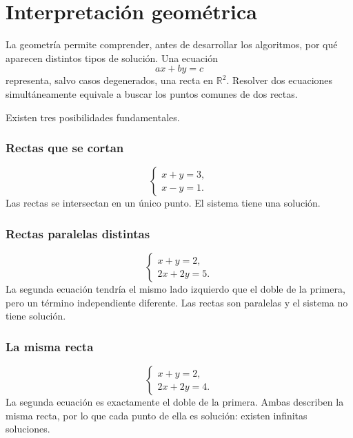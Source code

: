 \documentclass[12pt]{article}
\theoremstyle{remark}
\newcommand{\R}{\mathbb{R}}
\begin{document}
\section*{Interpretación geométrica}
La geometría permite comprender, antes de desarrollar los algoritmos, por qué aparecen distintos tipos de solución.
Una ecuación
\[
ax+by=c
\]
representa, salvo casos degenerados, una recta en $\R^2$. Resolver dos ecuaciones simultáneamente equivale a buscar los puntos comunes de dos rectas.

Existen tres posibilidades fundamentales.
\subsubsection*{Rectas que se cortan}
\[
\begin{cases}
x+y=3,\\
x-y=1.
\end{cases}
\]
Las rectas se intersectan en un único punto. El sistema tiene una solución.
\subsubsection*{Rectas paralelas distintas}
\[
\begin{cases}
x+y=2,\\
2x+2y=5.
\end{cases}
\]
La segunda ecuación tendría el mismo lado izquierdo que el doble de la primera, pero un término independiente diferente. Las rectas son paralelas y el sistema no tiene solución.
\subsubsection*{La misma recta}
\[
\begin{cases}
x+y=2,\\
2x+2y=4.
\end{cases}
\]
La segunda ecuación es exactamente el doble de la primera. Ambas describen la misma recta, por lo que cada punto de ella es solución: existen infinitas soluciones.
\end{document}
